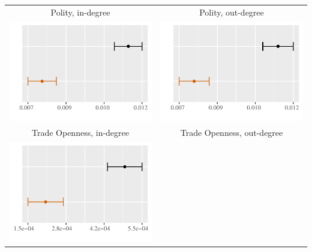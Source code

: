\documentclass[reqno,onecolumn,letterpaper,12pt]{article}
\begin{document}
\begin{longtable}[!h]{c@{\hskip 0cm}c}
Polity, in-degree & Polity, out-degree\\
\includegraphics[height=.18\textheight, clip=true, trim=0cm 0cm 0cm .2cm]{draft_figures/plots_pooled/Polity_in.pdf} &
\includegraphics[height=.18\textheight, clip=true, trim=0cm 0cm 0cm .2cm]{draft_figures/plots_pooled/Polity_out.pdf}   \\
Trade Openness, in-degree & Trade Openness, out-degree\\
\includegraphics[height=.18\textheight, clip=true, trim=0cm 0cm 0cm .2cm]{draft_figures/plots_pooled/Trade_in.pdf} &

\end{longtable}
\end{document}
